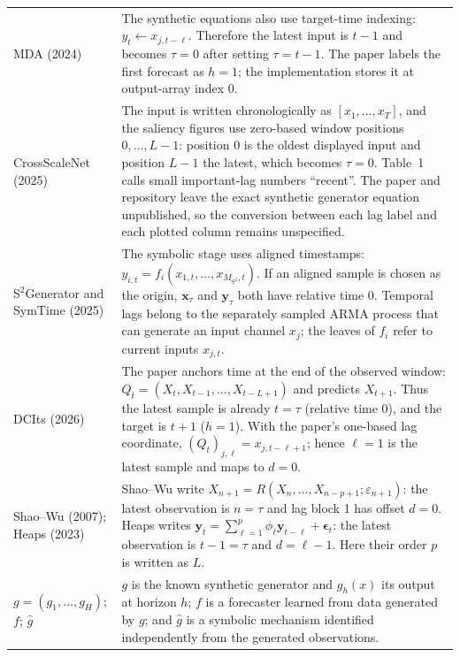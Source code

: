 \begin{longtable}{@{}
>{\raggedright\arraybackslash}p{}
>{\raggedright\arraybackslash}p{}@{}}
MDA (2024) &
The synthetic equations also use target-time indexing:
$y_t\leftarrow x_{j,t-\ell}$. Therefore the latest input is $t-1$ and becomes
$\tau=0$ after setting $\tau=t-1$. The paper labels the first forecast as
$h=1$; the implementation stores it at output-array index 0. \\

CrossScaleNet (2025) &
The input is written chronologically as $[x_1,\ldots,x_T]$, and the saliency
figures use zero-based window positions $0,\ldots,L-1$: position 0 is the
oldest displayed input and position $L-1$ the latest, which becomes $\tau=0$.
Table~1 calls small important-lag numbers ``recent''. The paper and repository
leave the exact synthetic generator equation unpublished, so the conversion
between each lag label and each plotted column remains unspecified. \\

S$^2$Generator and SymTime (2025) &
The symbolic stage uses aligned timestamps:
$y_{i,t}=f_i(x_{1,t},\ldots,x_{M_{\mathrm{S^2}},t})$. If an aligned sample is
chosen as the origin, $\mathbf x_{\tau}$ and $\mathbf y_{\tau}$ both have
relative time 0. Temporal lags belong to the separately sampled ARMA process
that can generate an input channel $x_j$; the leaves of $f_i$ refer to current
inputs $x_{j,t}$. \\

DCIts (2026) &
The paper anchors time at the end of the observed window:
$Q_t=(X_t,X_{t-1},\ldots,X_{t-L+1})$ and predicts $X_{t+1}$. Thus the latest
sample is already $t=\tau$ (relative time 0), and the target is $t+1$
($h=1$). With the paper's one-based lag coordinate,
$(Q_t)_{j,\ell}=x_{j,t-\ell+1}$; hence $\ell=1$ is the latest sample and maps
to $d=0$. \\

Shao--Wu (2007); Heaps (2023) &
Shao--Wu write $X_{n+1}=R(X_n,\ldots,X_{n-p+1};\varepsilon_{n+1})$:
the latest observation is $n=\tau$ and lag block 1 has offset $d=0$.
Heaps writes $\mathbf y_t=\sum_{\ell=1}^{p}\phi_\ell\mathbf y_{t-\ell}
+\boldsymbol\epsilon_t$: the latest observation is $t-1=\tau$ and
$d=\ell-1$. Here their order $p$ is written as $L$. \\

$g=(g_1,\ldots,g_H)$; $f$; $\widehat g$ &
$g$ is the known synthetic generator and $g_h(x)$ its output at horizon $h$;
$f$ is a forecaster learned from data generated by $g$; and $\widehat g$ is a
symbolic mechanism identified independently from the generated observations. \\


\end{longtable}
